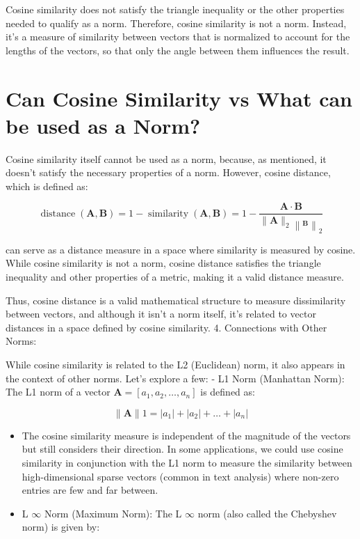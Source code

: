 \documentclass[
  12 pt,
  a4paper,
]{book}
\providecommand{\tightlist}{%
  \setlength{\itemsep}{0pt}\setlength{\parskip}{0pt}}
\numberwithin{equation}{section}
\theoremstyle{plain}      %
\theoremstyle{definition} %
\theoremstyle{remark}     %
\theoremstyle{note}         %
\begin{document}
Cosine similarity does not satisfy the triangle inequality or the other
properties needed to qualify as a norm. Therefore, cosine similarity is
not a norm. Instead, it's a measure of similarity between vectors that
is normalized to account for the lengths of the vectors, so that only
the angle between them influences the result.

\hypertarget{can-cosine-similarity-vs-what-can-be-used-as-a-norm}{%
\section{Can Cosine Similarity vs What can be used as a
Norm?}\label{can-cosine-similarity-vs-what-can-be-used-as-a-norm}}

Cosine similarity itself cannot be used as a norm, because, as
mentioned, it doesn't satisfy the necessary properties of a norm.
However, cosine distance, which is defined as:

\[
\operatorname{distance}(\mathbf{A}, \mathbf{B})=1-\operatorname{similarity}(\mathbf{A}, \mathbf{B})=1-\frac{\mathbf{A} \cdot \mathbf{B}}{\|\mathbf{A}\|_2\left\|_{\mathbf{B}}\right\|_2}
\]

can serve as a distance measure in a space where similarity is measured
by cosine. While cosine similarity is not a norm, cosine distance
satisfies the triangle inequality and other properties of a metric,
making it a valid distance measure.

Thus, cosine distance is a valid mathematical structure to measure
dissimilarity between vectors, and although it isn't a norm itself, it's
related to vector distances in a space defined by cosine similarity. 4.
Connections with Other Norms:

While cosine similarity is related to the L2 (Euclidean) norm, it also
appears in the context of other norms. Let's explore a few: - L1 Norm
(Manhattan Norm): The L1 norm of a vector
\(\mathbf{A}=\left[a_1, a_2, \ldots, a_n\right]\) is defined as:

\[
\|\mathbf{A}\| 1=\left|a_1\right|+\left|a_2\right|+\ldots+\left|a_n\right|
\]

\begin{itemize}
\tightlist
\item
  The cosine similarity measure is independent of the magnitude of the
  vectors but still considers their direction. In some applications, we
  could use cosine similarity in conjunction with the L1 norm to measure
  the similarity between high-dimensional sparse vectors (common in text
  analysis) where non-zero entries are few and far between.
\item
  L \(\infty\) Norm (Maximum Norm): The L \(\infty\) norm (also called
  the Chebyshev norm) is given by:
\end{itemize}
\end{document}
